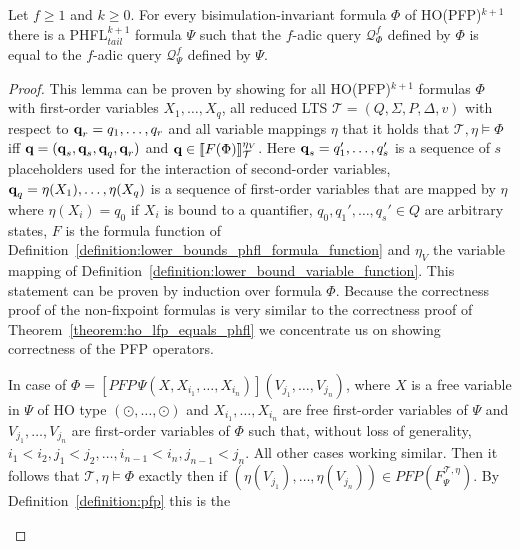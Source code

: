 \begin{lemma}
    \label{lemma:ho_pfp_equals_phfl_tail}
    Let $f \geq 1$ and $k \geq 0$. For every bisimulation-invariant formula $\Phi$ of HO(PFP)$^{k + 1}$ there is a
    PHFL$^{k+1}_{tail}$ formula $\Psi$ such that the $f$-adic query $\mathcal{Q}_\Phi^f$ defined by $\Phi$ is equal to the $f$-adic query  $\mathcal{Q}_\Psi^f$ defined by $\Psi$.
\end{lemma}

\begin{proof}
    This lemma can be proven by showing for all HO(PFP)$^{k+1}$ formulas $\Phi$ with first-order variables $X_1,
    \dots, X_q$, all reduced LTS $\mathcal{T} = (Q, \Sigma, P,
    \Delta, v)$ with respect to $\emph{q}_r = q_1, \dots, q_r$ and all variable mappings $\eta$ that it holds that $\mathcal{T}, \eta \models \Phi$ iff $\emph{q} =
    (\emph{q}_s, \emph{q}_s, \emph{q}_q, \emph{q}_r)$ and $\emph{q} \in \llbracket
   F(\Phi)\rrbracket^{\eta_V}_{\mathcal{T}}$. Here $\emph{q}_s = q_1',\dots,q_s'$ is a sequence of $s$ placeholders used for the interaction of second-order variables, $\emph{q}_q = \eta(X_1), \dots, \eta(X_q)$ is a sequence of first-order variables that are mapped by $\eta$ where $\eta(X_i) = q_0$ if $X_i$ is bound to a quantifier, $q_0, q_1', \dots, q_s' \in Q$ are arbitrary states, $F$ is the formula function of
    Definition~\ref{definition:lower_bounds_phfl_formula_function} and $\eta_V$ the variable mapping of
    Definition~\ref{definition:lower_bound_variable_function}. This statement can be proven by induction over formula
    $\Phi$.
    Because the correctness proof of the non-fixpoint formulas is very similar to the correctness proof of Theorem~\ref{theorem:ho_lfp_equals_phfl} we concentrate us on showing correctness of the PFP operators.
    \begin{compactitem}
    \item In case of $\Phi = [PFP\,\Psi(X, X_{i_1}, \dots, X_{i_n})](V_{j_1}, \dots, V_{j_n})$, where $X$ is a
        free variable in $\Psi$ of HO type $(\odot, \dots, \odot)$ and $X_{i_1}, \dots, X_{i_n}$ are free first-order
        variables of $\Psi$ and $V_{j_1}, \dots, V_{j_n}$ are first-order variables of $\Phi$ such that, without loss of generality, $i_1 < i_2, j_1 < j_2, \dots, i_{n-1} < i_n, j_{n-1} < j_n$. All other cases working similar. Then it follows that
        $\mathcal{T}, \eta \models \Phi$ exactly then if $(\eta(V_{j_1}), \dots, \eta(V_{j_n})) \in PFP
        (F_\Psi^{\mathcal{T},\eta})$. 
        By Definition~\ref{definition:pfp} this is the 

\end{compactitem}
\end{proof}
